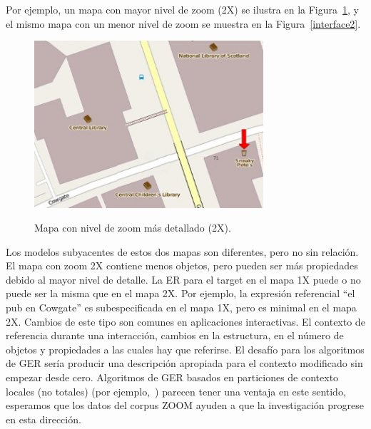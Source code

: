 Por ejemplo, un mapa con mayor nivel de zoom (2X) se ilustra en la Figura~\ref{fig-with-zoom}, y el mismo mapa con un menor nivel de zoom se muestra en la Figura~\ref{interface2}.

\begin{figure}[H]
\begin{center}
\includegraphics[width=8.5cm]{images/with-zoom.jpg}\\[0pt]
\caption{Mapa con nivel de zoom m\'as detallado (2X).}
\label{fig-with-zoom}
\end{center}
\end{figure}


 Los modelos subyacentes de estos dos mapas son diferentes, pero no sin relaci\'on. El mapa con zoom 2X contiene menos objetos, pero pueden ser m\'as propiedades debido al mayor nivel de detalle. La ER para el target en el mapa 1X puede o no puede ser la misma que en el mapa 2X. Por ejemplo, la expresi\'on referencial ``el pub en Cowgate'' es subespecificada en el mapa 1X, pero es minimal en el mapa 2X. Cambios de este tipo son comunes en aplicaciones interactivas. El contexto de referencia durante una interacci\'on, cambios en la estructura, en el n\'umero de objetos y propiedades a las cuales hay que referirse. El desaf\'{i}o para los algoritmos de GER ser\'{i}a producir una descripci\'on apropiada para el contexto modificado sin empezar desde cero. Algoritmos de GER basados en particiones de  contexto locales (no totales) (por ejemplo,~\cite{areces08}) parecen tener una ventaja en este sentido, esperamos que los datos del corpus ZOOM ayuden a que la investigaci\'on progrese en esta direcci\'on.


